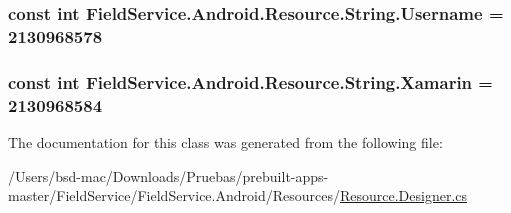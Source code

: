 \hypertarget{class_field_service_1_1_android_1_1_resource_1_1_string_ae35f91a7ed1b3b82ed277c98f70586a4}{
\subsubsection[{Username}]{\setlength{\rightskip}{0pt plus 5cm}const int Field\+Service.\+Android.\+Resource.\+String.\+Username = 2130968578}}\label{class_field_service_1_1_android_1_1_resource_1_1_string_ae35f91a7ed1b3b82ed277c98f70586a4}
\hypertarget{class_field_service_1_1_android_1_1_resource_1_1_string_ae01b3c3e3cd9182586321568305268b1}{
\subsubsection[{Xamarin}]{\setlength{\rightskip}{0pt plus 5cm}const int Field\+Service.\+Android.\+Resource.\+String.\+Xamarin = 2130968584}}\label{class_field_service_1_1_android_1_1_resource_1_1_string_ae01b3c3e3cd9182586321568305268b1}


The documentation for this class was generated from the following file\+:\begin{DoxyCompactItemize}
\item 
/\+Users/bsd-\/mac/\+Downloads/\+Pruebas/prebuilt-\/apps-\/master/\+Field\+Service/\+Field\+Service.\+Android/\+Resources/\hyperlink{_field_service_8_android_2_resources_2_resource_8designer_8cs}{Resource.\+Designer.\+cs}\end{DoxyCompactItemize}
